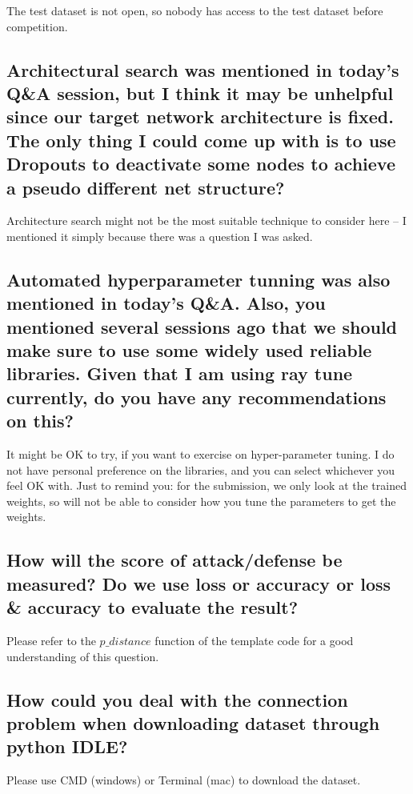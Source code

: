 The test dataset is not open, so nobody has access to the test dataset before competition. 



\subsection*{Architectural search was mentioned in today's Q\&A session, but I think it may be unhelpful since our target network architecture is fixed. The only thing I could come up with is to use Dropouts to deactivate some nodes to achieve a pseudo different net structure?}

Architecture search might not be the most suitable technique to consider here – I mentioned it simply because there was a question I was asked. 

\subsection*{Automated hyperparameter tunning was also mentioned in today's Q\&A. Also, you mentioned several sessions ago that we should make sure to use some widely used reliable libraries. Given that I am using ray tune currently, do you have any recommendations on this?}

It might be OK to try, if you want to exercise on hyper-parameter tuning. I do not have personal preference on the libraries, and you can select whichever you feel OK with. Just to remind you: for the submission, we only look at the trained weights, so will not be able to consider how you tune the parameters to get the weights. 

\subsection*{How will the score of attack/defense be measured? Do we use loss or accuracy or loss \& accuracy to evaluate the result?} 

Please refer to the $p\_distance$ function of the template code for a good understanding of this question.

\subsection*{How could you deal with the connection problem when downloading dataset through python IDLE?} 

Please use CMD (windows) or Terminal (mac) to download the dataset.



